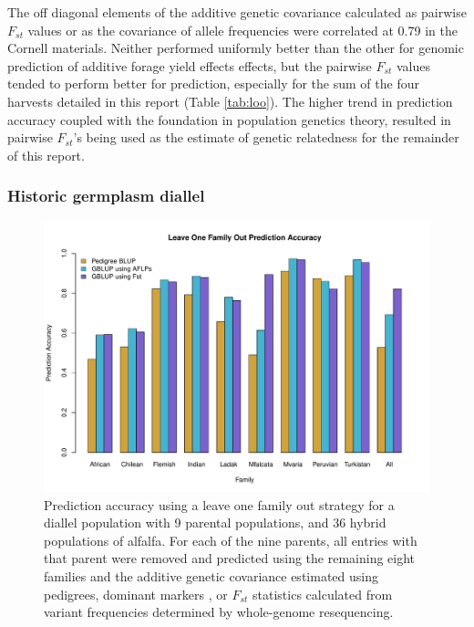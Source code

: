 \documentclass[12pt, letterpaper]{article}
\begin{document}
The off diagonal elements of the additive genetic covariance calculated as pairwise $F_{st}$ values or as the covariance of allele frequencies were correlated at 0.79 in the Cornell materials. Neither performed uniformly better than the other for genomic prediction of additive forage yield effects effects, but the pairwise $F_{st}$ values tended to perform better for prediction, especially for the sum of the four harvests detailed in this report (Table \ref{tab:loo}). The higher trend in prediction accuracy coupled with the foundation in population genetics theory, resulted in pairwise $F_{st}$'s being used as the estimate of genetic relatedness for the remainder of this report.

\subsubsection{Historic germplasm diallel}

\begin{figure}
\includegraphics[width = \linewidth]{FstLeaveOneFamOutPredAcc}
\caption{Prediction accuracy using a leave one family out strategy for a diallel population with 9 parental populations, and 36 hybrid populations of alfalfa. For each of the nine parents, all entries with that parent were removed and predicted using the remaining eight families and the additive genetic covariance estimated using pedigrees, dominant markers \parencite[1544 AFLPs;][]{segovia2003}, or $F_{st}$ statistics calculated from variant frequencies determined by whole-genome resequencing.}
\label{diallelpredacc}
\end{figure}
\end{document}
